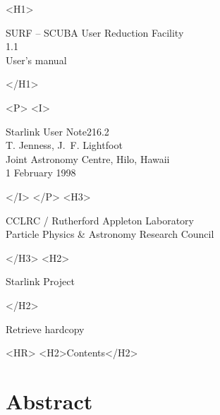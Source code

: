 \documentclass[twoside,11pt]{article}
\newcommand{\stardoccategory}  {Starlink User Note}
\newcommand{\stardocsource}    {sun\stardocnumber}
\newcommand{\stardocnumber}    {216.2}
\newcommand{\stardocauthors}   {T. Jenness, J.~F. Lightfoot\\
                                Joint Astronomy Centre, Hilo, Hawaii}
\newcommand{\stardocdate}      {1 February 1998}
\newcommand{\stardoctitle}     {SURF -- SCUBA User Reduction Facility}
\newcommand{\stardocversion}   {1.1}
\newcommand{\stardocmanual}    {User's manual}
\newcommand{\htmladdnormallink}[2]{#1}
\newcommand{\htmladdimg}[1]{}
\newcommand{\htmlref}[2]{#1}
\newcommand{\htmladdtonavigation}[1]{}
\newcommand{\xlabel}[1]{}
\newcommand{\latexonlytoc}[0]{\tableofcontents}
\begin{document}
\begin{htmlonly}
   \xlabel{}
   \begin{rawhtml} <H1> \end{rawhtml}
      \stardoctitle\\
      \stardocversion\\
      \stardocmanual
   \begin{rawhtml} </H1> \end{rawhtml}



   \begin{rawhtml} <P> <I> \end{rawhtml}
   \stardoccategory \stardocnumber \\
   \stardocauthors \\
   \stardocdate
   \begin{rawhtml} </I> </P> <H3> \end{rawhtml}
      \htmladdnormallink{CCLRC}{http://www.cclrc.ac.uk} /
      \htmladdnormallink{Rutherford Appleton Laboratory}
                        {http://www.cclrc.ac.uk/ral} \\
      \htmladdnormallink{Particle Physics \& Astronomy Research Council}
                        {http://www.pparc.ac.uk} \\
   \begin{rawhtml} </H3> <H2> \end{rawhtml}
      \htmladdnormallink{Starlink Project}{http://star-www.rl.ac.uk/}
   \begin{rawhtml} </H2> \end{rawhtml}
   \htmladdnormallink{\htmladdimg{source.gif} Retrieve hardcopy}
      {http://star-www.rl.ac.uk/cgi-bin/hcserver?\stardocsource}\\

  \label{stardoccontents}
  \begin{rawhtml} 
    <HR>
    <H2>Contents</H2>
  \end{rawhtml}
  \renewcommand{\latexonlytoc}[0]{}
  \htmladdtonavigation{\htmlref{\htmladdimg{contents_motif.gif}}
        {stardoccontents}}

  \section{\xlabel{abstract}Abstract}
\end{htmlonly}
\end{document}
